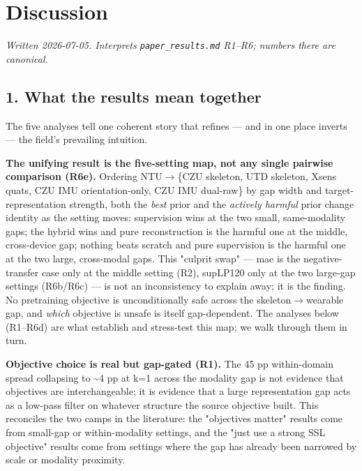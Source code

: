 \section{Discussion}

\textit{Written 2026-07-05. Interprets \texttt{paper\_results.md} R1--R6; numbers there are canonical.}

\subsection{1. What the results mean together}

The five analyses tell one coherent story that refines --- and in one place inverts --- the field's prevailing intuition.

\textbf{The unifying result is the five-setting map, not any single pairwise comparison (R6e).} Ordering NTU$\rightarrow$\{CZU skeleton, UTD skeleton, Xsens quats, CZU IMU orientation-only, CZU IMU dual-raw\} by gap width and target-representation strength, both the \textit{best} prior and the \textit{actively harmful} prior change identity as the setting moves: supervision wins at the two small, same-modality gaps; the hybrid wins and pure reconstruction is the harmful one at the middle, cross-device gap; nothing beats scratch and pure supervision is the harmful one at the two large, cross-modal gaps. This "culprit swap" --- mae is the negative-transfer case only at the middle setting (R2), supLP120 only at the two large-gap settings (R6b/R6c) --- is not an inconsistency to explain away; it is the finding. No pretraining objective is unconditionally safe across the skeleton$\rightarrow$wearable gap, and \textit{which} objective is unsafe is itself gap-dependent. The analyses below (R1--R6d) are what establish and stress-test this map; we walk through them in turn.

\textbf{Objective choice is real but gap-gated (R1).} The 45 pp within-domain spread collapsing to \textasciitilde{}4 pp at k=1 across the modality gap is not evidence that objectives are interchangeable; it is evidence that a large representation gap acts as a low-pass filter on whatever structure the source objective built. This reconciles the two camps in the literature: the "objectives matter" results come from small-gap or within-modality settings, and the "just use a strong SSL objective" results come from settings where the gap has already been narrowed by scale or modality proximity.

